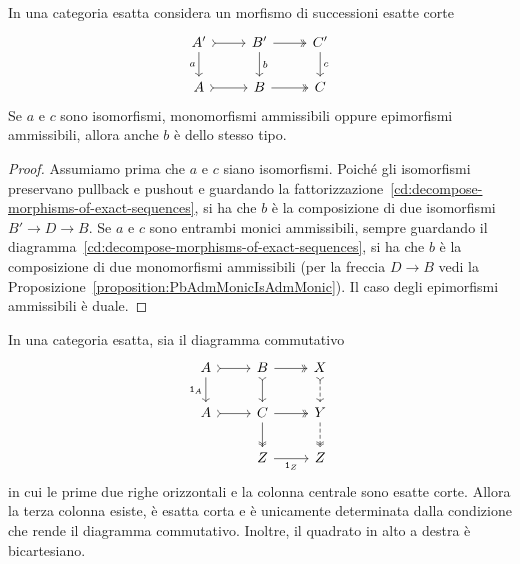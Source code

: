 \begin{corollary}
  \label{cor:five-lemma}
  In una categoria esatta considera un morfismo di successioni esatte
  corte
  \[
    \begin{tikzcd}
      A' \ar["{a}", d, swap] \ar["{}", rightarrowtail, r] & B' \ar["{b}", d] \ar["{}", twoheadrightarrow, r] & C' \ar["{c}", d] \\
      A \ar["{}", rightarrowtail, r] & B \ar["{}", twoheadrightarrow, r]
      & C
    \end{tikzcd}
  \]
  Se \(a\) e \(c\) sono isomorfismi, monomorfismi ammissibili oppure
  epimorfismi ammissibili, allora anche \(b\) è dello stesso tipo.
\end{corollary}

\begin{proof}
  Assumiamo prima che \(a\) e \(c\) siano isomorfismi. Poiché gli
  isomorfismi preservano pullback e pushout e guardando la
  fattorizzazione~\eqref{cd:decompose-morphisms-of-exact-sequences}, si
  ha che \(b\) è la composizione di due isomorfismi \(B' \to D \to
  B\). Se \(a\) e \(c\) sono entrambi monici ammissibili, sempre
  guardando il
  diagramma~\eqref{cd:decompose-morphisms-of-exact-sequences}, si ha che
  \(b\) è la composizione di due monomorfismi ammissibili (per la
  freccia \(D \to B\) vedi la
  Proposizione~\ref{proposition:PbAdmMonicIsAdmMonic}). Il caso degli
  epimorfismi ammissibili è duale.
\end{proof}

\begin{lemma}
  \label{lem:c/b=(c/a)/(b/a)}
  In una categoria esatta, sia il diagramma commutativo
  \[
    \begin{tikzcd}
      A \ar["{\id_A}", d, swap] \ar["{}", rightarrowtail, r] & B
      \ar["{}", rightarrowtail, d] \ar["{}", twoheadrightarrow, r] & X
      \ar["{}", dashed, rightarrowtail, d] \\
      A \ar["{}", rightarrowtail, r] & C \ar["{}", twoheadrightarrow, d]
      \ar["{}", twoheadrightarrow, r] & Y \ar["{}", dashed, twoheadrightarrow, d] \\
      & Z \ar["{\id_Z}", r, swap] & Z
    \end{tikzcd}
  \]
  in cui le prime due righe orizzontali e la colonna centrale sono
  esatte corte. Allora la terza colonna esiste, è esatta corta e è
  unicamente determinata dalla condizione che rende il diagramma
  commutativo. Inoltre, il quadrato in alto a destra è bicartesiano.
\end{lemma}

